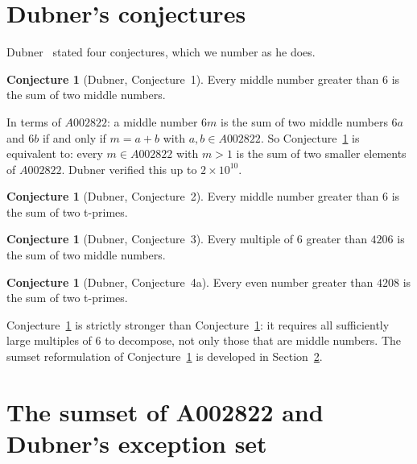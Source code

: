 \documentclass[12pt]{amsart}
\theoremstyle{definition}
\newtheorem{conjecture}[theorem]{Conjecture}
\begin{document}
\section{Dubner's conjectures}
\label{sec:dubner}

Dubner~\cite{dubner1999} stated four conjectures, which we number as he does.

\begin{conjecture}[Dubner, Conjecture~1]
\label{conj:wagler}
Every middle number greater than $6$ is the sum of two middle numbers.
\end{conjecture}

In terms of $A002822$: a middle number $6m$ is the sum of two middle numbers $6a$ and
$6b$ if and only if $m = a + b$ with $a, b \in A002822$. So
Conjecture~\ref{conj:wagler} is equivalent to: every $m \in A002822$ with $m > 1$ is
the sum of two smaller elements of $A002822$. Dubner verified this up to $2 \times 10^{10}$.

\begin{conjecture}[Dubner, Conjecture~2]
\label{conj:dubner2}
Every middle number greater than $6$ is the sum of two t-primes.
\end{conjecture}

\begin{conjecture}[Dubner, Conjecture~3]
\label{conj:dubner3}
Every multiple of $6$ greater than $4206$ is the sum of two middle numbers.
\end{conjecture}

\begin{conjecture}[Dubner, Conjecture~4a]
\label{conj:dubner4a}
Every even number greater than $4208$ is the sum of two t-primes.
\end{conjecture}

Conjecture~\ref{conj:dubner3} is strictly stronger than Conjecture~\ref{conj:wagler}:
it requires all sufficiently large multiples of $6$ to decompose, not only those that are
middle numbers. The sumset reformulation of Conjecture~\ref{conj:dubner3} is developed in
Section~\ref{sec:sumset}.

\section{The sumset of A002822 and Dubner's exception set}
\label{sec:sumset}
\end{document}
